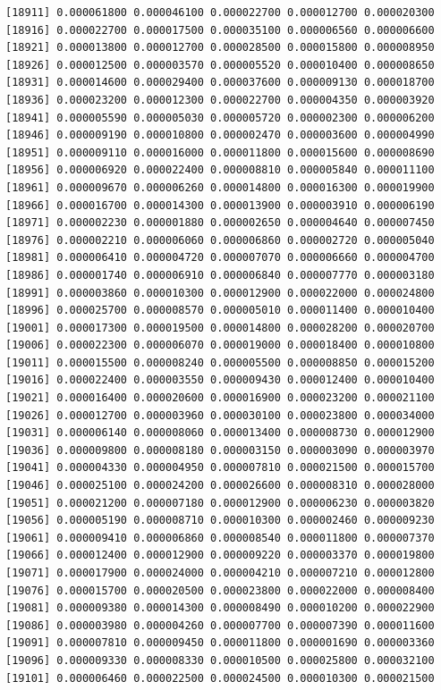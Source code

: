 \documentclass[]{article}
\begin{document}
\begin{verbatim}
[18911] 0.000061800 0.000046100 0.000022700 0.000012700 0.000020300
[18916] 0.000022700 0.000017500 0.000035100 0.000006560 0.000006600
[18921] 0.000013800 0.000012700 0.000028500 0.000015800 0.000008950
[18926] 0.000012500 0.000003570 0.000005520 0.000010400 0.000008650
[18931] 0.000014600 0.000029400 0.000037600 0.000009130 0.000018700
[18936] 0.000023200 0.000012300 0.000022700 0.000004350 0.000003920
[18941] 0.000005590 0.000005030 0.000005720 0.000002300 0.000006200
[18946] 0.000009190 0.000010800 0.000002470 0.000003600 0.000004990
[18951] 0.000009110 0.000016000 0.000011800 0.000015600 0.000008690
[18956] 0.000006920 0.000022400 0.000008810 0.000005840 0.000011100
[18961] 0.000009670 0.000006260 0.000014800 0.000016300 0.000019900
[18966] 0.000016700 0.000014300 0.000013900 0.000003910 0.000006190
[18971] 0.000002230 0.000001880 0.000002650 0.000004640 0.000007450
[18976] 0.000002210 0.000006060 0.000006860 0.000002720 0.000005040
[18981] 0.000006410 0.000004720 0.000007070 0.000006660 0.000004700
[18986] 0.000001740 0.000006910 0.000006840 0.000007770 0.000003180
[18991] 0.000003860 0.000010300 0.000012900 0.000022000 0.000024800
[18996] 0.000025700 0.000008570 0.000005010 0.000011400 0.000010400
[19001] 0.000017300 0.000019500 0.000014800 0.000028200 0.000020700
[19006] 0.000022300 0.000006070 0.000019000 0.000018400 0.000010800
[19011] 0.000015500 0.000008240 0.000005500 0.000008850 0.000015200
[19016] 0.000022400 0.000003550 0.000009430 0.000012400 0.000010400
[19021] 0.000016400 0.000020600 0.000016900 0.000023200 0.000021100
[19026] 0.000012700 0.000003960 0.000030100 0.000023800 0.000034000
[19031] 0.000006140 0.000008060 0.000013400 0.000008730 0.000012900
[19036] 0.000009800 0.000008180 0.000003150 0.000003090 0.000003970
[19041] 0.000004330 0.000004950 0.000007810 0.000021500 0.000015700
[19046] 0.000025100 0.000024200 0.000026600 0.000008310 0.000028000
[19051] 0.000021200 0.000007180 0.000012900 0.000006230 0.000003820
[19056] 0.000005190 0.000008710 0.000010300 0.000002460 0.000009230
[19061] 0.000009410 0.000006860 0.000008540 0.000011800 0.000007370
[19066] 0.000012400 0.000012900 0.000009220 0.000003370 0.000019800
[19071] 0.000017900 0.000024000 0.000004210 0.000007210 0.000012800
[19076] 0.000015700 0.000020500 0.000023800 0.000022000 0.000008400
[19081] 0.000009380 0.000014300 0.000008490 0.000010200 0.000022900
[19086] 0.000003980 0.000004260 0.000007700 0.000007390 0.000011600
[19091] 0.000007810 0.000009450 0.000011800 0.000001690 0.000003360
[19096] 0.000009330 0.000008330 0.000010500 0.000025800 0.000032100
[19101] 0.000006460 0.000022500 0.000024500 0.000010300 0.000021500

\end{verbatim}
\end{document}
